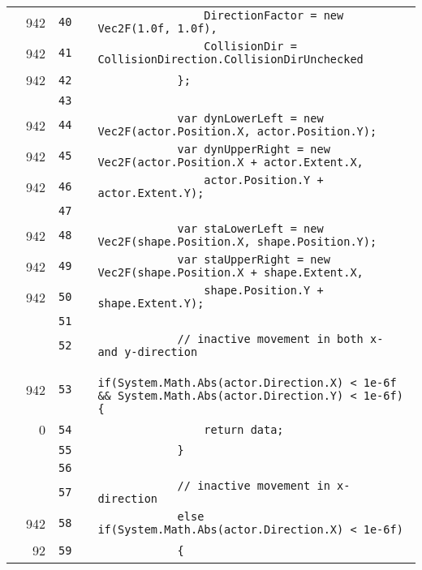 \documentclass[a4paper,landscape,10pt]{article}
\begin{document}
\begin{longtable}[l]{lrrll}
\cellcolor{green} & 942 & \verb~40~ & & \verb~                DirectionFactor = new Vec2F(1.0f, 1.0f),~\\
\cellcolor{green} & 942 & \verb~41~ & & \verb~                CollisionDir = CollisionDirection.CollisionDirUnchecked~\\
\cellcolor{green} & 942 & \verb~42~ & & \verb~            };~\\
\cellcolor{gray} &  & \verb~43~ & & \verb~~\\
\cellcolor{green} & 942 & \verb~44~ & & \verb~            var dynLowerLeft = new Vec2F(actor.Position.X, actor.Position.Y);~\\
\cellcolor{green} & 942 & \verb~45~ & & \verb~            var dynUpperRight = new Vec2F(actor.Position.X + actor.Extent.X,~\\
\cellcolor{green} & 942 & \verb~46~ & & \verb~                actor.Position.Y + actor.Extent.Y);~\\
\cellcolor{gray} &  & \verb~47~ & & \verb~~\\
\cellcolor{green} & 942 & \verb~48~ & & \verb~            var staLowerLeft = new Vec2F(shape.Position.X, shape.Position.Y);~\\
\cellcolor{green} & 942 & \verb~49~ & & \verb~            var staUpperRight = new Vec2F(shape.Position.X + shape.Extent.X,~\\
\cellcolor{green} & 942 & \verb~50~ & & \verb~                shape.Position.Y + shape.Extent.Y);~\\
\cellcolor{gray} &  & \verb~51~ & & \verb~~\\
\cellcolor{gray} &  & \verb~52~ & & \verb~            // inactive movement in both x- and y-direction~\\
\cellcolor{orange} & 942 & \verb~53~ & & \verb~            if(System.Math.Abs(actor.Direction.X) < 1e-6f && System.Math.Abs(actor.Direction.Y) < 1e-6f) {~\\
\cellcolor{red} & 0 & \verb~54~ & & \verb~                return data;~\\
\cellcolor{gray} &  & \verb~55~ & & \verb~            }~\\
\cellcolor{gray} &  & \verb~56~ & & \verb~~\\
\cellcolor{gray} &  & \verb~57~ & & \verb~            // inactive movement in x-direction~\\
\cellcolor{green} & 942 & \verb~58~ & & \verb~            else if(System.Math.Abs(actor.Direction.X) < 1e-6f)~\\
\cellcolor{green} & 92 & \verb~59~ & & \verb~            {~\\

\end{longtable}
\end{document}
